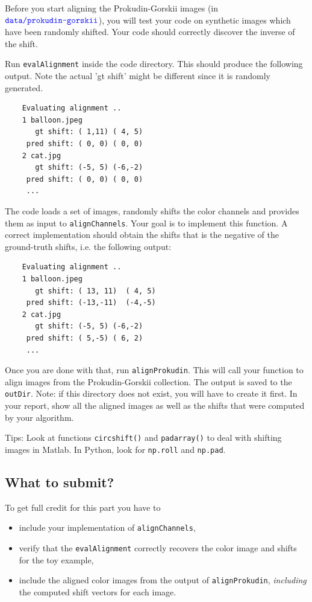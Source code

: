 \documentclass[10pt,letterpaper]{article}
\newcommand{\cmd}[1] {{\color{blue}\texttt{#1}}}
\begin{document}
Before you start aligning the Prokudin-Gorskii images (in $\cmd{data/prokudin-gorskii}$), you will test your code on synthetic images which have been randomly shifted. Your code should correctly discover the inverse of the shift.

Run \cmd{evalAlignment} inside the code directory. This should produce the following output. Note the actual 'gt shift' might be different since it is randomly generated.
\begin{verbatim}
    Evaluating alignment ..
    1 balloon.jpeg
	   gt shift: ( 1,11) ( 4, 5)
	 pred shift: ( 0, 0) ( 0, 0)
    2 cat.jpg
	   gt shift: (-5, 5) (-6,-2)
	 pred shift: ( 0, 0) ( 0, 0)
     ...
\end{verbatim}
    
The code loads a set of images, randomly shifts the color channels and provides them as input to \cmd{alignChannels}. Your goal is to implement this function. A correct implementation should obtain the shifts that is the negative of the ground-truth shifts, i.e. the following output:

\begin{verbatim}
    Evaluating alignment ..
    1 balloon.jpeg
	   gt shift: ( 13, 11)  ( 4, 5)
	 pred shift: (-13,-11)  (-4,-5)
    2 cat.jpg
	   gt shift: (-5, 5) (-6,-2)
	 pred shift: ( 5,-5) ( 6, 2)
     ...
\end{verbatim}
    
Once you are done with that, run \cmd{alignProkudin}. This will call your function to align images from the Prokudin-Gorskii collection. The output is saved to the \cmd{outDir}. Note: if this directory does not exist, you will have to create it first. In your report, show all the aligned images as well as the shifts that were computed by your algorithm.

Tips: Look at functions \cmd{circshift()} and \cmd{padarray()} to deal with shifting images in Matlab. In Python, look for \cmd{np.roll} and \cmd{np.pad}.

\subsection{What to submit?}
To get full credit for this part you have to 
\begin{itemize}
\item include your implementation of \cmd{alignChannels},
\item verify that the \cmd{evalAlignment} correctly recovers the color image and shifts for the toy example, 
\item include the aligned color images from the output of \cmd{alignProkudin},
\emph{including} the computed shift vectors for each image.
\end{itemize}
\end{document}

